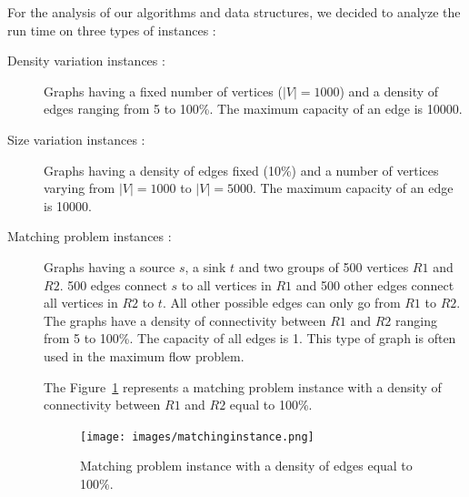 
For the analysis of our algorithms and data structures, we decided to analyze the run time on three types of instances :
\begin{description}
\item[Density variation instances :]{Graphs having a fixed number of vertices ($|V|=1000$) and a density of edges ranging from 5 to 100\%. The maximum capacity of an edge is 10000.}
\item[Size variation instances :]{Graphs having a density of edges fixed (10\%) and a number of vertices varying from $|V|=1000$ to $|V|=5000$. The maximum capacity of an edge is 10000.}
\item[Matching problem instances :]{Graphs having a source $s$, a sink $t$ and two groups of 500 vertices $R1$ and $R2$. 500 edges connect $s$ to all vertices in $R1$ and 500 other edges connect all vertices in $R2$ to $t$. All other possible edges can only go from $R1$ to $R2$. The graphs have a density of connectivity between $R1$ and $R2$ ranging from 5 to 100\%. The capacity of all edges is 1.
This type of graph is often used in the maximum flow problem.

The Figure~\ref{fig:matching} represents a matching problem instance with a density of connectivity between $R1$ and $R2$ equal to 100\%.

\begin{figure}[H]
\begin{center}
\texttt{[image: images/matchinginstance.png]}
\caption{Matching problem instance with a density of edges equal to 100\%.}
\label{fig:matching}
\end{center}
\end{figure}}
\end{description} 


